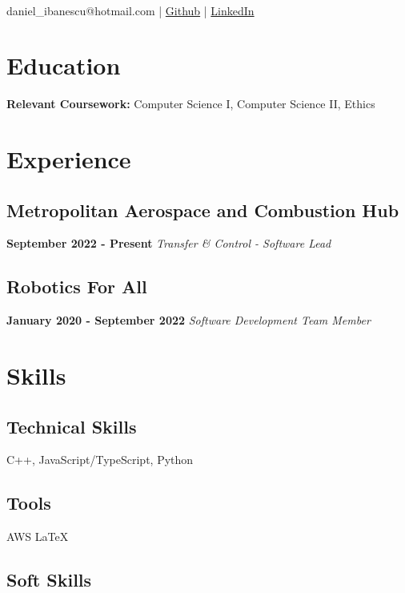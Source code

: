\documentclass[12pt, letterpaper]{article}
\author{Daniel Ibanescu}
\date{April 2023}
\makeatletter
\renewcommand{\maketitle}{
              \begin{center}
                  {\huge\bfseries\theauthor} \\ %
                  daniel\_ibanescu@hotmail.com | %
                  \href{https://github.com/zazu7765}{Github} %
                  | \href{https://linkedin.com/in/ibada}{LinkedIn} %
              \end{center}
              \vspace{-2.5em} %
          }
\makeatother
\begin{document}
\maketitle
\section{Education}
\textbf{Relevant Coursework:} Computer Science I, Computer Science II, Ethics
\section{Experience}
\subsection{Metropolitan Aerospace and Combustion Hub}
\textbf{September 2022 - Present}
\textit{Transfer \& Control - Software Lead}
\subsection{Robotics For All}
\textbf{January 2020 - September 2022}
\textit{Software Development Team Member}
\section{Skills}
\subsection{Technical Skills}
C++, JavaScript/TypeScript, Python
\subsection{Tools}
AWS
\LaTeX
\subsection{Soft Skills}
\end{document}
